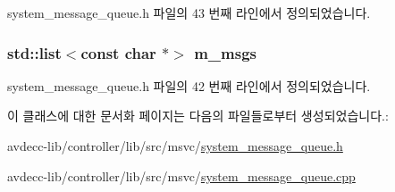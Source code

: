 system\+\_\+message\+\_\+queue.\+h 파일의 43 번째 라인에서 정의되었습니다.

\subsubsection[{\texorpdfstring{m\+\_\+msgs}{m_msgs}}]{\setlength{\rightskip}{0pt plus 5cm}std\+::list$<$const char $\ast$$>$ m\+\_\+msgs\hspace{0.3cm}{\ttfamily [private]}}\hypertarget{classavdecc__lib_1_1system__message__queue_ac4b819207076184ff8d43af789b8cadb}{}\label{classavdecc__lib_1_1system__message__queue_ac4b819207076184ff8d43af789b8cadb}


system\+\_\+message\+\_\+queue.\+h 파일의 42 번째 라인에서 정의되었습니다.



이 클래스에 대한 문서화 페이지는 다음의 파일들로부터 생성되었습니다.\+:\begin{DoxyCompactItemize}
\item 
avdecc-\/lib/controller/lib/src/msvc/\hyperlink{msvc_2system__message__queue_8h}{system\+\_\+message\+\_\+queue.\+h}\item 
avdecc-\/lib/controller/lib/src/msvc/\hyperlink{msvc_2system__message__queue_8cpp}{system\+\_\+message\+\_\+queue.\+cpp}\end{DoxyCompactItemize}
